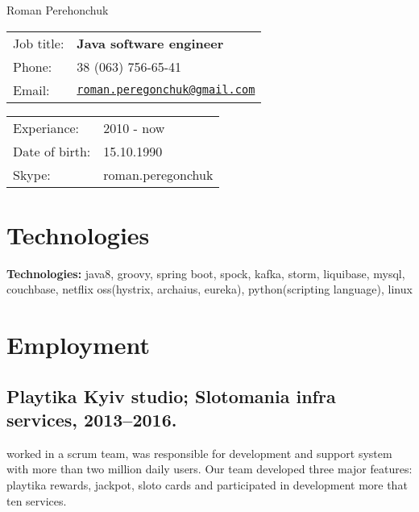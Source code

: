 \documentclass[letterpaper]{article}
\def\name{Roman Perehonchuk}
\renewenvironment{itemize}{
  \begin{list}{}{
    \setlength{\leftmargin}{1.5em}
  }
}{
  \end{list}
}
\begin{document}
{\huge \name}


\vspace{0.25in}

\begin{minipage}{0.45\linewidth}
  \begin{tabular}{ll}
    Job title: & \textbf{Java software engineer} \\
    Phone: & 38 (063) 756-65-41 \\
    Email: & \href{mailto:roman.peregonchuk@gmail.com}{\tt roman.peregonchuk@gmail.com} \\
  \end{tabular}
\end{minipage}
\begin{minipage}{0.45\linewidth}
  \begin{tabular}{ll}
    Experiance: & 2010 - now \\
    Date of birth: & 15.10.1990 \\
    Skype: & roman.peregonchuk \\
  \end{tabular}
\end{minipage}

\section*{Technologies}

\begin{itemize}
\item \textbf{Technologies:} java8, groovy, spring boot, spock, kafka, storm, liquibase, mysql, couchbase, netflix oss(hystrix, archaius, eureka), python(scripting language), linux  
\end{itemize}

\section*{Employment}

\subsection*{Playtika Kyiv studio; Slotomania infra services, 2013--2016.}

\begin{itemize}
\item worked in a scrum team, was responsible for development and support system with more than two million daily users. Our team developed three major features: playtika rewards, jackpot, sloto cards and participated in development more that ten services.  
\end{itemize}
\end{document}
